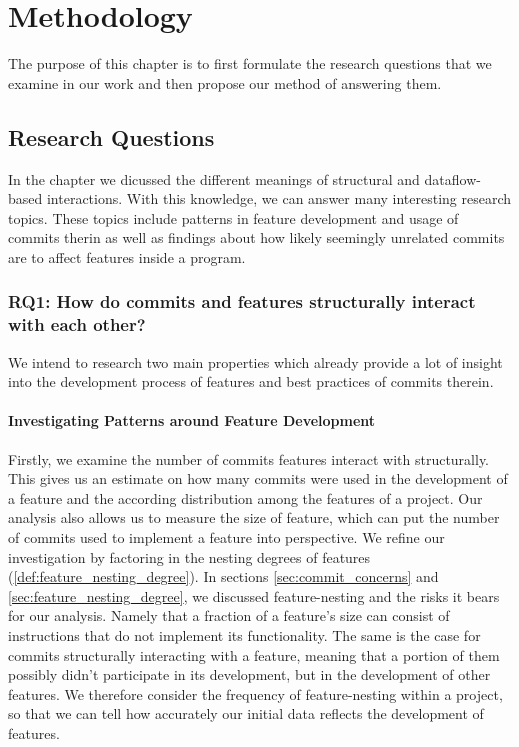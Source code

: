 \chapter{Methodology}\label{ch:methodology}

The purpose of this chapter is to first formulate the research questions that we examine in our work
and then propose our method of answering them.

\section{Research Questions}\label{sec:research_questions}

In the  chapter we dicussed the different meanings of structural and dataflow-based interactions.
With this knowledge, we can answer many interesting research topics. 
These topics include patterns in feature development and usage of commits therin as well as findings about how likely seemingly unrelated commits are to affect features inside a program.

\subsection*{\textbf{RQ1: How do commits and features structurally interact with each other?}}

We intend to research two main properties which already provide a lot of insight into the development process of features and best practices of commits therein.

\subsubsection*{Investigating Patterns around Feature Development}

Firstly, we examine the number of commits features interact with structurally. 
This gives us an estimate on how many commits were used in the development of a feature and the according distribution among the features of a project.
Our analysis also allows us to measure the size of feature, which can put the number of commits used to implement a feature into perspective.
We refine our investigation by factoring in the nesting degrees of features (\ref{def:feature_nesting_degree}). 
In sections \ref{sec:commit_concerns} and \ref{sec:feature_nesting_degree}, we discussed feature-nesting and the risks it bears for our analysis.
Namely that a fraction of a feature's size can consist of instructions that do not implement its functionality.
The same is the case for commits structurally interacting with a feature, meaning that a portion of them possibly didn't participate in its development, but in the development of other features.
We therefore consider the frequency of feature-nesting within a project, so that we can tell how accurately our initial data reflects the development of features.

